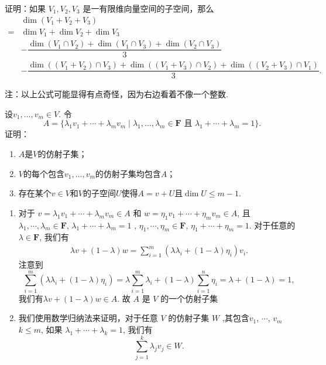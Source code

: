 \begin{exercise}
\begin{exgroup}
\begin{answer}
        \end{answer}

        \item 证明：如果 $V_1,V_2,V_3$ 是一有限维向量空间的子空间，那么
        \begin{align*}
            &\dim(V_1+V_2+V_3) \\
            ={} & \dim V_1+\dim V_2+\dim V_3 \\
            &-\dfrac{\dim(V_1\cap V_2)+\dim(V_1\cap V_3)+\dim(V_2\cap V_3)}{3} \\
            &-\dfrac{\dim((V_1 + V_2) \cap V_3) + \dim((V_1 + V_3) \cap V_2) + \dim((V_2 + V_3) \cap V_1)}{3}.
        \end{align*}

        注：以上公式可能显得有点奇怪，因为右边看着不像一个整数.
        \begin{answer}

        \end{answer}

        \item 设$v_1,\ldots,v_m\in V$. 令
        \[A=\{\lambda_1v_1+\cdots+\lambda_mv_m \mid \lambda_1,\ldots,\lambda_m\in\mathbf{F}\text{~且~}\lambda_1+\cdots+\lambda_m=1\}.\]
        证明：
        \begin{enumerate}
            \item $A$是$V$的仿射子集；

            \item $V$的每个包含$v_1,\ldots,v_m$的仿射子集均包含$A$；

            \item 存在某个$v\in V$和$V$的子空间$U$使得$A=v+U$且$\dim U\leqslant m-1$.
        \end{enumerate}
    \begin{answer}
        \begin{enumerate}
            \item 对于 $v=\lambda_1 v_1+\cdots+\lambda_m v_m\in A$ 和 $w=\eta_1 v_1+\cdots+\eta_m v_m\in A$, 且 $\lambda_1,\cdots,\lambda_m\in  \mathbf{F}$, $\lambda_1+\cdots+\lambda_m=1$ , $\eta_1,\cdots,\eta_m\in \mathbf{F}$, $\eta_1+\cdots+\eta_m=1$. 对于任意的$\lambda\in \mathbf{F}$, 我们有
            \begin{align*}
                \lambda v+(1-\lambda) w=\sum_{i=1}^m(\lambda\lambda_i+(1-\lambda)\eta_i)v_i.
            \end{align*}
            注意到
            \[ \sum_{i=1}^m(\lambda\lambda_i+(1-\lambda)\eta_i)=\lambda\sum_{i=1}^m\lambda_i+(1-\lambda)\sum_{i=1}^n\eta_i=\lambda+(1-\lambda)=1, \]
            我们有$\lambda v+(1-\lambda) w\in A$. 故 $A$ 是 $V$ 的一个仿射子集
        \item 我们使用数学归纳法来证明，对于任意 $V$ 的仿射子集 $W$ ,其包含$v_1$, $\cdots$, $v_m$$k\le m$,
            如果 $\lambda_1+\cdots+\lambda_k=1$,
            我们有 \[ \sum_{j=1}^k\lambda_jv_j\in W. \]


\end{enumerate}
\end{answer}
\end{exgroup}
\end{exercise}
